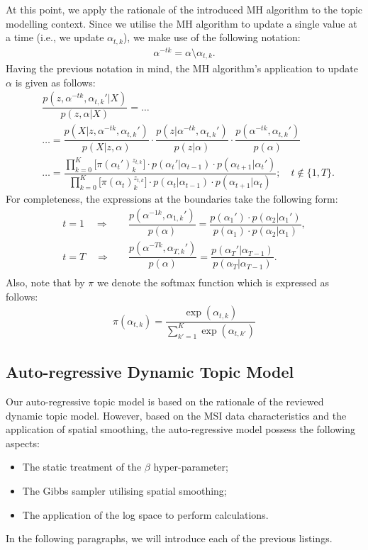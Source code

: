 \documentclass{mpaper}
\begin{document}
\par At this point, we apply the rationale of the introduced MH algorithm to the topic modelling context. Since we utilise the MH algorithm to update a single value at a time (i.e., we update $\alpha_{t,k}$), we make use of the following notation:
\begin{align*}
  \alpha^{-tk} = \alpha \setminus \alpha_{t,k}.
\end{align*} 
Having the previous notation in mind, the MH algorithm's application to update $\alpha$ is given as follows:
\begin{align*}
  &\dfrac{p(z,\alpha^{-tk},\alpha_{t, k}'|X)}{p(z,\alpha|X)} = \ldots\\
  &\ldots = \dfrac{p(X|z,\alpha^{-tk},\alpha_{t, k}')}{p(X|z,\alpha)}\cdot \dfrac{p(z|\alpha^{-tk},\alpha_{t, k}')}{p(z|\alpha)}\cdot \dfrac{p(\alpha^{-tk},\alpha_{t, k}')}{p(\alpha)}\\
  &\dots = \dfrac{\prod_{k=0}^K\big[\pi(\alpha_{t}')_k^{z_{t,k}}\big]\cdot p(\alpha_t'|\alpha_{t-1})\cdot p(\alpha_{t+1}|\alpha_t')}{\prod_{k=0}^K\big[\pi(\alpha_t)_k^{z_{t,k}}\big]\cdot p(\alpha_t|\alpha_{t-1})\cdot p(\alpha_{t+1}|\alpha_t)};\quad t \not\in \{1,T\}.
\end{align*}
For completeness, the expressions at the boundaries take the following form:
\begin{align*}
t=1 \quad \Longrightarrow \quad &\dfrac{p(\alpha^{-1k},\alpha_{1, k}')}{p(\alpha)} = \dfrac{p(\alpha_{1}')\cdot p(\alpha_{2}|\alpha_{1}')}{p(\alpha_{1})\cdot p(\alpha_{2}|\alpha_{1})},\\
t=T \quad \Longrightarrow \quad &\dfrac{p(\alpha^{-Tk},\alpha_{T, k}')}{p(\alpha)} = \dfrac{p(\alpha_{T}'|\alpha_{T-1})}{p(\alpha_{T}|\alpha_{T-1})}.\\
\end{align*}
Also, note that by $\pi$ we denote the softmax function which is expressed as follows:
\begin{align*}
  \pi(\alpha_{t,k}) = \dfrac{\exp(\alpha_{t,k})}{\sum_{k'=1}^K \exp(\alpha_{t,k'})}
\end{align*} 

\subsection{Auto-regressive Dynamic Topic Model}

\par Our auto-regressive topic model is based on the rationale of the reviewed dynamic topic model. However, based on the MSI data characteristics and the application of spatial smoothing, the auto-regressive model possess the following aspects:
\begin{itemize}
	\item The static treatment of the $\beta$ hyper-parameter;
	\item The Gibbs sampler utilising spatial smoothing;
	\item The application of the log space to perform calculations.
\end{itemize}
In the following paragraphs, we will introduce each of the previous listings.
\end{document}
